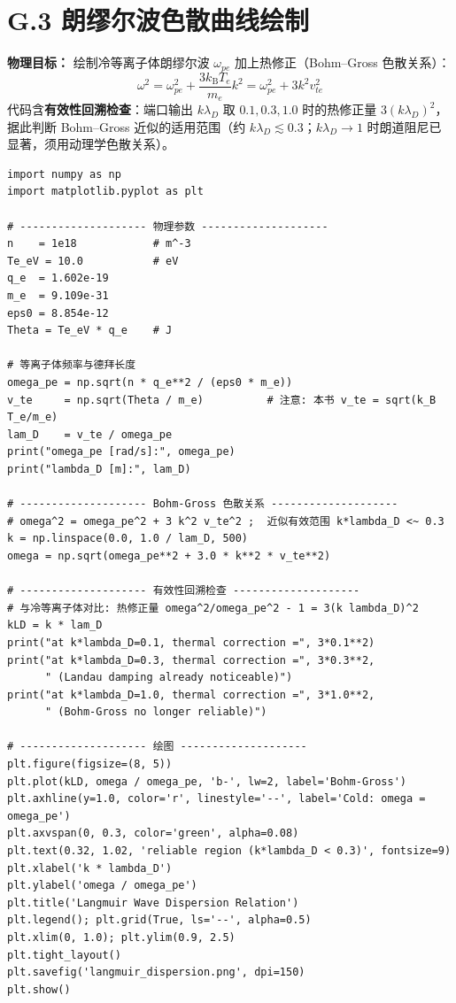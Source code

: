 \documentclass[12pt,a4paper,openany,oneside]{book}
\begin{document}
\section{G.3 朗缪尔波色散曲线绘制}

\textbf{物理目标：} 绘制冷等离子体朗缪尔波 $\omega_{pe}$ 加上热修正（Bohm--Gross 色散关系）：
\begin{equation}
\omega^2 = \omega_{pe}^2 + \frac{3k_\mathrm{B}T_e}{m_e}k^2 = \omega_{pe}^2 + 3k^2v_{te}^2
\end{equation}
代码含\textbf{有效性回溯检查}：端口输出 $k\lambda_D$ 取 $0.1,0.3,1.0$ 时的热修正量 $3(k\lambda_D)^2$，据此判断 Bohm--Gross 近似的适用范围（约 $k\lambda_D\lesssim0.3$；$k\lambda_D\to1$ 时朗道阻尼已显著，须用动理学色散关系）。

\begin{verbatim}
import numpy as np
import matplotlib.pyplot as plt

# -------------------- 物理参数 --------------------
n    = 1e18            # m^-3
Te_eV = 10.0           # eV
q_e  = 1.602e-19
m_e  = 9.109e-31
eps0 = 8.854e-12
Theta = Te_eV * q_e    # J

# 等离子体频率与德拜长度
omega_pe = np.sqrt(n * q_e**2 / (eps0 * m_e))
v_te     = np.sqrt(Theta / m_e)          # 注意: 本书 v_te = sqrt(k_B T_e/m_e)
lam_D    = v_te / omega_pe
print("omega_pe [rad/s]:", omega_pe)
print("lambda_D [m]:", lam_D)

# -------------------- Bohm-Gross 色散关系 --------------------
# omega^2 = omega_pe^2 + 3 k^2 v_te^2 ;  近似有效范围 k*lambda_D <~ 0.3
k = np.linspace(0.0, 1.0 / lam_D, 500)
omega = np.sqrt(omega_pe**2 + 3.0 * k**2 * v_te**2)

# -------------------- 有效性回溯检查 --------------------
# 与冷等离子体对比: 热修正量 omega^2/omega_pe^2 - 1 = 3(k lambda_D)^2
kLD = k * lam_D
print("at k*lambda_D=0.1, thermal correction =", 3*0.1**2)
print("at k*lambda_D=0.3, thermal correction =", 3*0.3**2,
      " (Landau damping already noticeable)")
print("at k*lambda_D=1.0, thermal correction =", 3*1.0**2,
      " (Bohm-Gross no longer reliable)")

# -------------------- 绘图 --------------------
plt.figure(figsize=(8, 5))
plt.plot(kLD, omega / omega_pe, 'b-', lw=2, label='Bohm-Gross')
plt.axhline(y=1.0, color='r', linestyle='--', label='Cold: omega = omega_pe')
plt.axvspan(0, 0.3, color='green', alpha=0.08)
plt.text(0.32, 1.02, 'reliable region (k*lambda_D < 0.3)', fontsize=9)
plt.xlabel('k * lambda_D')
plt.ylabel('omega / omega_pe')
plt.title('Langmuir Wave Dispersion Relation')
plt.legend(); plt.grid(True, ls='--', alpha=0.5)
plt.xlim(0, 1.0); plt.ylim(0.9, 2.5)
plt.tight_layout()
plt.savefig('langmuir_dispersion.png', dpi=150)
plt.show()
\end{verbatim}
\end{document}
